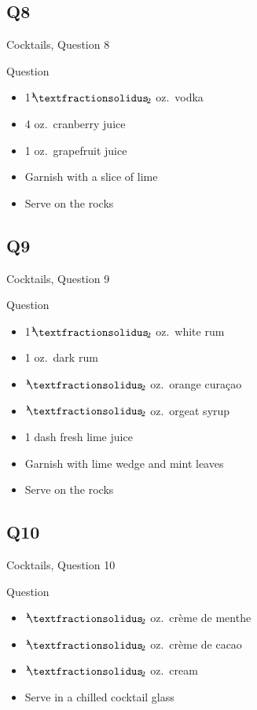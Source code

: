 \documentclass[11pt]{beamer}
\begin{document}
\subsection*{Q8}
\begin{frame}[t]{Cocktails, Question 8}
\begin{block}{Question}
\begin{itemize}
\item 1\({}^1{\mskip -5mu⁄\mskip -3mu}_2\) oz.\ vodka
\item 4 oz.\ cranberry juice
\item 1 oz.\ grapefruit juice
\item Garnish with a slice of lime
\item Serve on the rocks
\end{itemize}
\end{block}
\end{frame}
\subsection*{Q9}
\begin{frame}[t]{Cocktails, Question 9}
\begin{block}{Question}
\begin{itemize}
\item 1\({}^1{\mskip -5mu⁄\mskip -3mu}_2\) oz.\ white rum
\item 1 oz.\ dark rum
\item \({}^1{\mskip -5mu⁄\mskip -3mu}_2\) oz.\ orange curaçao
\item \({}^1{\mskip -5mu⁄\mskip -3mu}_2\) oz.\ orgeat syrup
\item 1 dash fresh lime juice
\item Garnish with lime wedge and mint leaves
\item Serve on the rocks
\end{itemize}
\end{block}
\end{frame}
\subsection*{Q10}
\begin{frame}[t]{Cocktails, Question 10}
\begin{block}{Question}
\begin{itemize}
\item \({}^1{\mskip -5mu⁄\mskip -3mu}_2\) oz.\ crème de menthe
\item \({}^1{\mskip -5mu⁄\mskip -3mu}_2\) oz.\ crème de cacao
\item \({}^1{\mskip -5mu⁄\mskip -3mu}_2\) oz.\ cream
\item Serve in a chilled cocktail glass
\end{itemize}
\end{block}
\end{frame}
\end{document}
